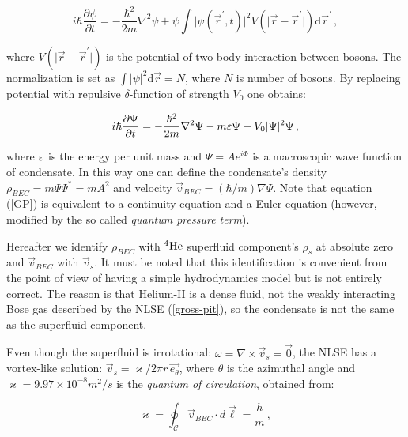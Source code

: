 \begin{equation}
i \hbar \frac{\partial \psi}{\partial t} = - \frac{\hbar^2}{2m} \nabla^2 \psi
+ \psi \int \vert \psi(\vec{r}^{\prime},t) \vert^2 V(\vert \vec{r} - \vec{r}^{\prime} \vert)
\text{d}\vec{r}^{\prime}\,,
\label{gross-pit}
\end{equation}

where $V(\vert \vec{r} - \vec{r}^{\prime} \vert)$ is the potential of two-body interaction between bosons. The normalization is set as $\int \vert \psi \vert^2 \text{d}\vec{r} = N$, where $N$ is number of bosons. By replacing potential with repulsive $\delta$-function of strength $V_0$ one obtains:

\begin{equation}
i \hbar \frac{\partial \Psi}{\partial t} = - \frac{\hbar^2}{2m} \nabla^2 \Psi - m\varepsilon \Psi + V_0 \vert \Psi \vert^2 \Psi\,,
\label{GP}
\end{equation}

where $\varepsilon$ is the energy per unit mass and $\Psi = A e^{i\Phi}$ is a macroscopic wave function of condensate. In this way one can define the condensate's density $\rho_{BEC} = m\Psi\Psi^* =  mA^2$ and velocity $\vec{v}_{BEC} = (\hbar / m)\nabla \Psi$. Note that equation (\ref{GP}) is equivalent to a continuity equation and a Euler equation (however, modified by the so called \textit{quantum pressure term}).

Hereafter we identify $\rho_{BEC}$ with ${}^4\mathrm{He}$ superfluid component's $\rho_s$ at absolute zero and $\vec{v}_{BEC}$ with $\vec{v}_s$. It must be noted that this identification is convenient from the point of view of having a simple hydrodynamics model but is not entirely correct. The reason is
that Helium-II is a dense fluid, not the weakly interacting Bose gas described
by the NLSE (\ref{gross-pit}), so the condensate is not the same as the superfluid component.

\newpage

Even though the superfluid is irrotational: $\omega = \nabla \times \vec{v}_s = \vec{0}$, the NLSE has a vortex-like solution: $\vec{v}_s = \varkappa / 2\pi r\, \vec{e_{\theta}}$, where $\theta$ is the azimuthal angle and $\varkappa=9.97 \times 10^{-8} \unit{m^2/s}$ is the \textit{quantum of circulation}, obtained from:

\begin{equation}
\varkappa = \oint_{\mathcal{C}} \vec{v}_{BEC} \cdot \unit{d}\vec{\boldsymbol{\ell}} = \frac{h}{m}\,,
\label{varkappa}
\end{equation}

